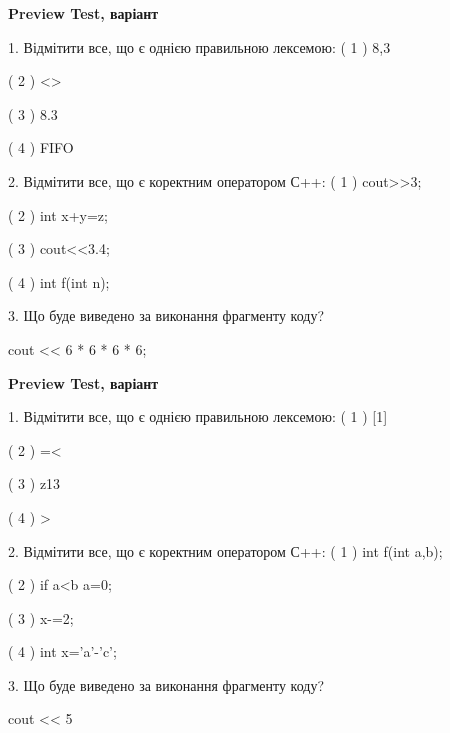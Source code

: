 \documentclass[11pt, ukrainian]{article}
\begin{document}
\begin{large}
\textbf{Preview Test, варіант }\par

1. Відмітити все, що є однією правильною лексемою:
( 1 ) 8,3

( 2 ) <>

( 3 ) 8.3

( 4 ) FIFO


2. Відмітити все, що є коректним оператором С++:
( 1 ) cout>>3;

( 2 ) int x+y=z;

( 3 ) cout<<3.4;

( 4 ) int f(int n);


3. Що буде виведено за виконання фрагменту коду?

cout << 6 * 6 * 6 * 6;

\end{large}
\vspace{20mm}
\begin{large}
\textbf{Preview Test, варіант }\par

1. Відмітити все, що є однією правильною лексемою:
( 1 ) [1]

( 2 ) =<

( 3 ) z13

( 4 ) >


2. Відмітити все, що є коректним оператором С++:
( 1 ) int f(int a,b);

( 2 ) if a<b a=0;

( 3 ) x-=2;

( 4 ) int x='a'-'c';


3. Що буде виведено за виконання фрагменту коду?

cout << 5 %

\end{large}
\newpage
\end{document}
